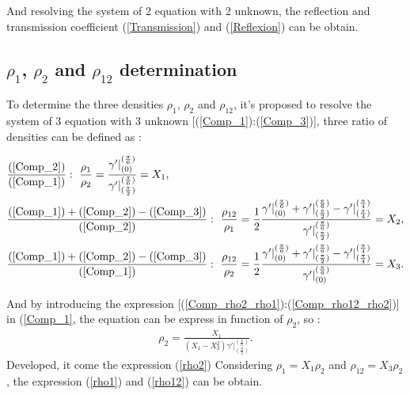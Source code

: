 \documentclass{article}
\begin{document}
    And resolving the system of 2 equation with 2 unknown, the reflection and transmission coefficient (\ref{Transmission}) and (\ref{Reflexion}) can be obtain.
    
\subsection*{$\rho_1$, $\rho_2$ and $\rho_{12}$ determination}
    To determine the three densities $\rho_1$, $\rho_2$ and $\rho_{12}$, it's proposed to resolve the system of 3 equation with 3 unknown  [(\ref{Comp_1}):(\ref{Comp_3})], three ratio of densities can be defined as : 
    
    \begin{align}
    &\frac{(\ref{Comp_2})}{(\ref{Comp_1})} :\ \frac{\rho_1}{\rho_2}=\frac{\gamma'|^{(\frac{\pi}{6})}_{(0)}}{\gamma'|^{(\frac{\pi}{6})}_{(\frac{\pi}{2})}}=X_1,\label{Comp_rho2_rho1} \\
    &\frac{(\ref{Comp_1})+(\ref{Comp_2})-(\ref{Comp_3})}{(\ref{Comp_2})} :\ \frac{\rho_{12}}{\rho_1}=\frac{1}{2}\frac{\gamma'|^{(\frac{\pi}{6})}_{(0)}+\gamma'|^{(\frac{\pi}{6})}_{(\frac{\pi}{2})}-\gamma'|^{(\frac{\pi}{4})}_{(\frac{\pi}{4})}}{\gamma'|^{(\frac{\pi}{6})}_{(\frac{\pi}{2})}}=X_2,\label{Comp_rho12_rho1} \\
    &\frac{(\ref{Comp_1})+(\ref{Comp_2})-(\ref{Comp_3})}{(\ref{Comp_1})} :\ \frac{\rho_{12}}{\rho_2}=\frac{1}{2}\frac{\gamma'|^{(\frac{\pi}{6})}_{(0)}+\gamma'|^{(\frac{\pi}{6})}_{(\frac{\pi}{2})}-\gamma'|^{(\frac{\pi}{4})}_{(\frac{\pi}{4})}}{\gamma'|^{(\frac{\pi}{6})}_{(0)}}=X_3.\label{Comp_rho12_rho2}
    \end{align}
    
    And by introducing the expression [(\ref{Comp_rho2_rho1}):(\ref{Comp_rho12_rho2})] in (\ref{Comp_1}, the equation can be express in function of $\rho_2$, so :
    \begin{align}
    \rho_2=\frac{X_1}{(X_1-X_3^2)\gamma'|^{(\frac{\pi}{6})}_{(\frac{\pi}{2})}}.\label{comp_rho2}
    \end{align}
    Developed, it come the expression (\ref{rho2})
    Considering $\rho_1=X_1\rho_2$ and $\rho_{12}=X_3\rho_2$, the expression (\ref{rho1}) and (\ref{rho12}) can be obtain.
    
\end{document}
